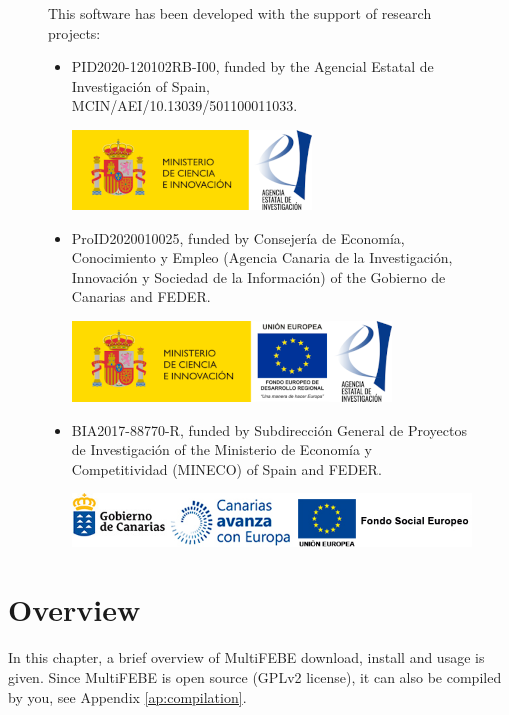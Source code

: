 \documentclass[a4paper,fleqn]{book}
\begin{document}
\begin{figure}[bh]
This software has been developed with the support of research projects: 
\begin{itemize}
    \item PID2020-120102RB-I00, funded by the Agencial Estatal de Investigaci\'on of Spain, \\ MCIN/AEI/10.13039/501100011033.
    \begin{center}
    \includegraphics[scale=0.9]{figures/miciinn-aei.png}
    \end{center}
    \item ProID2020010025, funded by Consejer\'ia de Econom\'ia, Conocimiento y Empleo (Agencia Canaria de la Investigaci\'on, Innovaci\'on y Sociedad de la Informaci\'on) of the Gobierno de Canarias and FEDER.
    \begin{center}
    \includegraphics[scale=0.9]{figures/miciinn-feder-aei.png}
    \end{center}
    \item BIA2017-88770-R, funded by Subdirecci\'on General de Proyectos de Investigaci\'on of the Ministerio de Econom\'ia y Competitividad (MINECO) of Spain and FEDER.
    \begin{center}
    \includegraphics[scale=0.9]{figures/gobcan-fse.png}
    \end{center}
\end{itemize}
\end{figure}

\tableofcontents

\chapter{Overview}

In this chapter, a brief overview of MultiFEBE download, install and usage is given. Since MultiFEBE is open source (GPLv2 license), it can also be compiled by you, see Appendix \ref{ap:compilation}.
\end{document}
